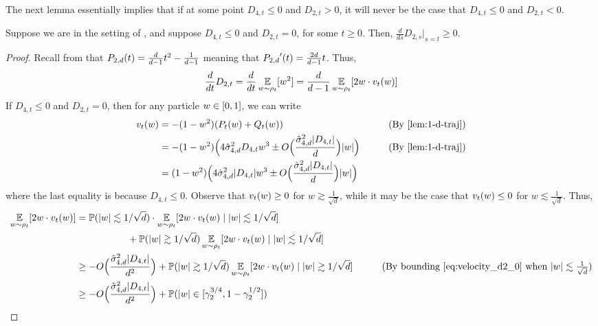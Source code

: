 The next lemma essentially implies that if at some point $D_{4, t} \leq 0$ and $D_{2, t} > 0$, it will never be the case that $D_{4, t} \leq 0$ and $D_{2, t} < 0$.

\begin{lemma} \label{lemma:phase3_case1_fixedB}
Suppose we are in the setting of , and suppose $D_{4, t} \leq 0$ and $D_{2, t} = 0$, for some $t \geq 0$. Then, $\frac{d}{ds} D_{2, s} \Big|_{s = t} \geq 0$.
\end{lemma}
\begin{proof}
Recall from  that ${P_{2, d}}(t) = \frac{d}{d - 1} t^2 - \frac{1}{d - 1}$ meaning that ${P_{2, d}}'(t) = \frac{2d}{d - 1} t$. Thus,
\begin{align}
\frac{d}{dt} D_{2, t}  = \frac{d}{dt} \operatorname*{\mathbb{E}}_{w \sim \rho_t}[w^2] = \frac{d}{d - 1} \operatorname*{\mathbb{E}}_{w \sim \rho_t} [2w \cdot v_t(w)]
\end{align}
If $D_{4, t} \leq 0$ and $D_{2, t} = 0$, then for any particle $w \in [0, 1]$, we can write
\begin{align}
\vel_t(\w)
& = -(1 - \w^2) (P_t(\w) + Q_t(\w)) 
& \tag{By \Cref{lem:1-d-traj}} \\
& = -(1 - \w^2) \Big(4 \sigmaCoeffFour^2 D_{4, t} \w^3 \pm O\Big(\frac{\sigmaCoeffFour^2 |D_{4, t}|}{d}\Big) |\w| \Big)
& \tag{By \Cref{lem:1-d-traj}} \\
& = (1 - \w^2) \Big(4 \sigmaCoeffFour^2 |D_{4, t}| \w^3 \pm O\Big(\frac{\sigmaCoeffFour^2 |D_{4, t}|}{d}\Big) |\w| \Big)
\label{eq:velocity_d2_0}
\end{align}
where the last equality is because $D_{4, t} \leq 0$. Observe that $v_t(w) \geq 0$ for $w \gtrsim \frac{1}{\sqrt{d}}$, while it may be the case that $v_t(w) \leq 0$ for $w \lesssim \frac{1}{\sqrt{d}}$. Thus,
\begin{align}
\E_{\w \sim \rho_t}[2\w \cdot \vel_t(\w)]
& = \Prob(|\w| \lesssim 1/\sqrt{d}) \cdot \E_{\w \sim \rho_t}[2\w \cdot \vel_t(\w) \mid |\w| \lesssim 1/\sqrt{d}] \\
& \nextlinespace\nextlinespace + \Prob(|\w| \gtrsim 1/\sqrt{d}) \E_{\w \sim \rho_t}[2\w \cdot \vel_t(\w) \mid |\w| \lesssim 1/\sqrt{d}] \\
& \geq -O\Big(\frac{\sigmaCoeffFour^2 |D_{4, t}|}{d^2}\Big) + \Prob(|\w| \gtrsim 1/\sqrt{d}) \E_{\w \sim \rho_t}[2\w \cdot \vel_t(\w) \mid |\w| \gtrsim 1/\sqrt{d}]
& \tag{By bounding \Cref{eq:velocity_d2_0} when $|\w| \lesssim \frac{1}{\sqrt{d}}$} \\
& \geq -O\Big(\frac{\sigmaCoeffFour^2 |D_{4, t}|}{d^2}\Big) + \Prob(|\w| \in [\gamma_2^{3/4}, 1 - \gamma_2^{1/2}]) \\

\end{align}
\end{proof}
